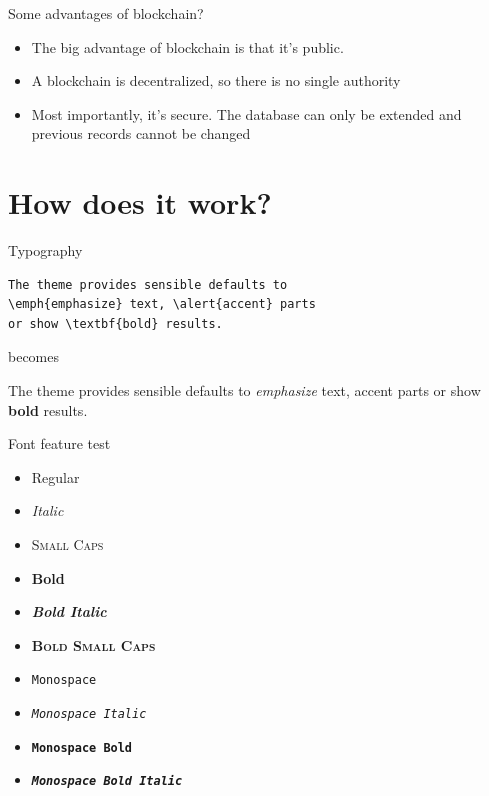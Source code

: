 \documentclass[10pt]{beamer}
\begin{document}
{
\begin{frame}{Some advantages of blockchain?}
\begin{itemize}

\item The big advantage of blockchain is that it's
public.
\item A blockchain is decentralized, so there is no
single authority
\item Most importantly, it's secure. The database
can only be extended and previous records
cannot be changed

\end{itemize}
\end{frame}
}

\section{How does it work?}

\begin{frame}[fragile]{Typography}
      \begin{verbatim}The theme provides sensible defaults to
\emph{emphasize} text, \alert{accent} parts
or show \textbf{bold} results.\end{verbatim}

  \begin{center}becomes\end{center}

  The theme provides sensible defaults to \emph{emphasize} text,
  \alert{accent} parts or show \textbf{bold} results.
\end{frame}

\begin{frame}{Font feature test}
  \begin{itemize}
    \item Regular
    \item \textit{Italic}
    \item \textsc{Small Caps}
    \item \textbf{Bold}
    \item \textbf{\textit{Bold Italic}}
    \item \textbf{\textsc{Bold Small Caps}}
    \item \texttt{Monospace}
    \item \texttt{\textit{Monospace Italic}}
    \item \texttt{\textbf{Monospace Bold}}
    \item \texttt{\textbf{\textit{Monospace Bold Italic}}}
  \end{itemize}
\end{frame}
\end{document}
